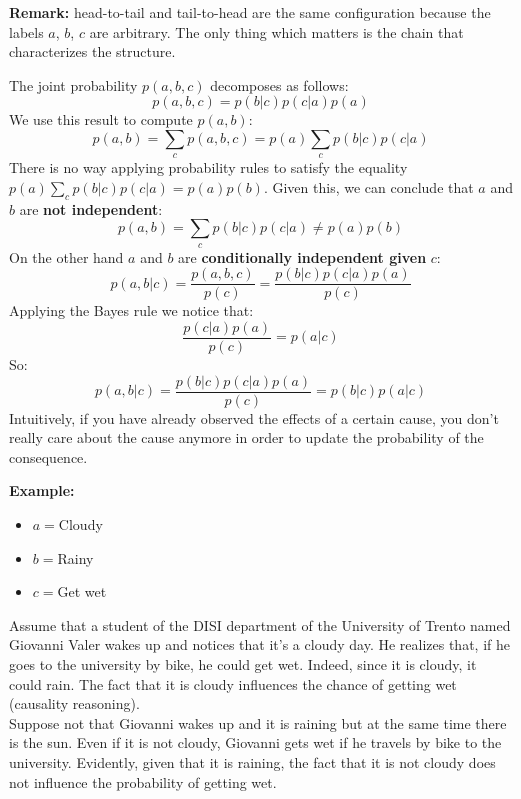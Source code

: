 \textbf{Remark:} head-to-tail and tail-to-head are the same configuration because the labels $a$, $b$, $c$ are arbitrary. The only thing which matters is the chain that characterizes the structure. \newline

The joint probability $p(a,b,c)$ decomposes as follows:
$$p(a,b,c) = p(b|c)p(c|a)p(a)$$
We use this result to compute $p(a,b)$:
$$p(a,b) = \sum_c p(a,b,c) = p(a) \sum_c p(b|c)p(c|a)$$
There is no way applying probability rules to satisfy the equality $p(a) \sum_c p(b|c)p(c|a) = p(a)p(b)$. Given this, we can conclude that $a$ and $b$ are \textbf{not independent}:
$$p(a,b) = \sum_c p(b|c)p(c|a) \neq p(a)p(b)$$
On the other hand $a$ and $b$ are \textbf{conditionally independent given} $c$:
$$p(a,b | c) = \frac{p(a,b,c)}{p(c)} = \frac{p(b|c)p(c|a)p(a)}{p(c)}$$
Applying the Bayes rule we notice that:
$$\frac{p(c|a)p(a)}{p(c)} = p(a|c)$$
So:
$$p(a,b | c) = \frac{p(b|c)p(c|a)p(a)}{p(c)} = p(b|c)p(a|c)$$
Intuitively, if you have already observed the effects of a certain cause, you don't really care about the cause anymore in order to update the probability of the consequence. \newline

\textbf{Example:}
\begin{itemize}
    \item $a=$Cloudy
    \item $b=$Rainy
    \item $c=$Get wet
\end{itemize}
Assume that a student of the DISI department of the University of Trento named Giovanni Valer wakes up and notices that it's a cloudy day. He realizes that, if he goes to the university by bike, he could get wet. Indeed, since it is cloudy, it could rain. The fact that it is cloudy influences the chance of getting wet (causality reasoning).\\
Suppose not that Giovanni wakes up and it is raining but at the same time there is the sun. Even if it is not cloudy, Giovanni gets wet if he travels by bike to the university. Evidently, given that it is raining, the fact that it is not cloudy does not influence the probability of getting wet.

